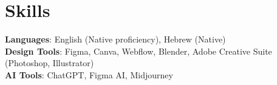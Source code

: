 \documentclass[letterpaper,11pt]{article}
\begin{document}
\section{Skills}
\begin{itemize}[leftmargin=0.15in, label={}]
   \small{\item{
    \textbf{Languages}{: English (Native proficiency), Hebrew (Native)} \\
    \textbf{Design Tools}{: Figma, Canva, Webflow, Blender, Adobe Creative Suite (Photoshop, Illustrator)} \\
    \textbf{AI Tools}{: ChatGPT, Figma AI, Midjourney}
   }}
\end{itemize}
\end{document}
